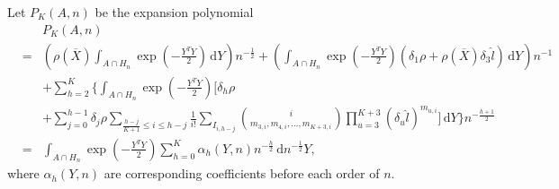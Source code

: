 \documentclass[oneside,english]{amsbook}
\numberwithin{section}{chapter}
\numberwithin{equation}{section}
\numberwithin{figure}{section}
\theoremstyle{plain}
\theoremstyle{plain}
\theoremstyle{definition}
\theoremstyle{plain}
\theoremstyle{plain}
\theoremstyle{remark}
\theoremstyle{definition}
\theoremstyle{definition}
\newcommand{\diff}{\,\mathrm{d}}
\begin{document}

Let $P_{K}\left(A,n\right)$ be the expansion polynomial 
\begin{eqnarray*}
 &  & P_{K}\left(A,n\right)\\
 & = & \left(\rho\left(\overline{X}\right)\int_{A\cap H_{n}}\exp\left(-\frac{Y^{T}Y}{2}\right)\diff Y\right)n^{-\frac{1}{2}}+\left(\int_{A\cap H_{n}}\exp\left(-\frac{Y^{T}Y}{2}\right)\left(\delta_{1}\rho+\rho\left(\overline{X}\right)\delta_{3}\hat{l}\right)\diff Y\right)n^{-1}\\
 &  & +\sum_{h=2}^{K}\Bigg\{\int_{A\cap H_{n}}\exp\left(-\frac{Y^{T}Y}{2}\right)\Bigg[\delta_{h}\rho\\
 &  & +\sum_{j=0}^{h-1}\delta_{j}\rho\sum_{\frac{h-j}{K+1}\le i\le h-j}\frac{1}{i!}\sum_{I_{i,h-j}}\binom{i}{m_{3,i},m_{4,i},\ldots,m_{K+3,i}}\prod_{u=3}^{K+3}\left(\delta_{u}\hat{l}\right)^{m_{u,i}}\Bigg]\diff Y\Bigg\} n^{-\frac{h+1}{2}}\\
 & = & \int_{A\cap H_{n}}\exp\left(-\frac{Y^{T}Y}{2}\right)\sum_{h=0}^{K}\alpha_{h}\left(Y,n\right)n^{-\frac{h}{2}}\diff n^{-\frac{1}{2}}Y,
\end{eqnarray*}
where $\alpha_{h}\left(Y,n\right)$ are corresponding coefficients
before each order of $n$. %

\end{document}
